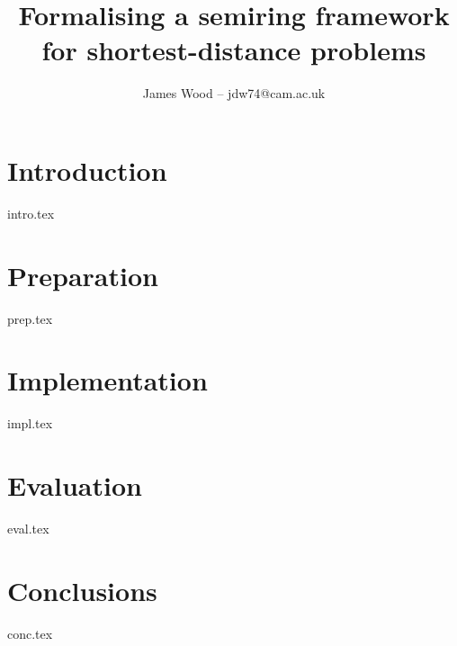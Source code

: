 \documentclass{article}
\begin{document}
\title{Formalising a semiring framework for shortest-distance problems}
\author{James Wood -- jdw74@cam.ac.uk}
\maketitle

\section{Introduction}
{intro.tex}

\section{Preparation}
{prep.tex}

\section{Implementation}
{impl.tex}

\section{Evaluation}
{eval.tex}

\section{Conclusions}
{conc.tex}




\end{document}
